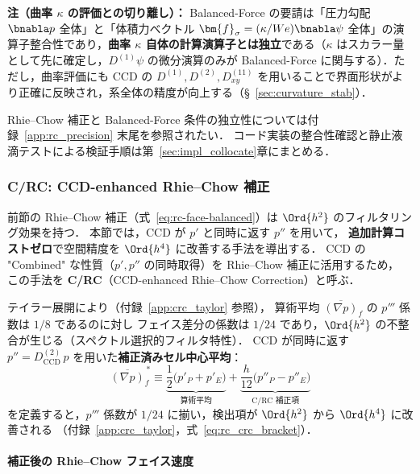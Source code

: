 \medskip
\noindent\textbf{注（曲率 $\kappa$ の評価との切り離し）：}
Balanced-Force の要請は「圧力勾配 $\bnabla p$ 全体」と「体積力ベクトル $\bm{f}_\sigma = (\kappa/We)\bnabla\psi$ 全体」の演算子整合性であり，\textbf{曲率 $\kappa$ 自体の計算演算子とは独立}である（$\kappa$ はスカラー量として先に確定し，$D^{(1)}\psi$ の微分演算のみが Balanced-Force に関与する）．ただし，曲率評価にも CCD の $D^{(1)}, D^{(2)}, D^{(11)}_{xy}$ を用いることで界面形状がより正確に反映され，系全体の精度が向上する（§~\ref{sec:curvature_stab}）．

Rhie--Chow 補正と Balanced-Force 条件の独立性については付録~\ref{app:rc_precision} 末尾を参照されたい．
コード実装の整合性確認と静止液滴テストによる検証手順は第~\ref{sec:impl_collocate}章にまとめる．

\subsubsection{C/RC: CCD-enhanced Rhie--Chow 補正}
\label{sec:rc_high_order}

前節の Rhie--Chow 補正（式~\eqref{eq:rc-face-balanced}）は $\Ord{h^2}$ のフィルタリング効果を持つ．
本節では，CCD が $p'$ と同時に返す $p''$ を用いて，
\textbf{追加計算コストゼロ}で空間精度を $\Ord{h^4}$ に改善する手法を導出する．
CCD の "Combined" な性質（$p', p''$ の同時取得）を Rhie--Chow 補正に活用するため，
この手法を \textbf{C/RC}（CCD-enhanced Rhie--Chow Correction）と呼ぶ．

テイラー展開により（付録~\ref{app:crc_taylor} 参照），
算術平均 $\overline{(\nabla p)}_f$ の $p'''$ 係数は $1/8$ であるのに対し
フェイス差分の係数は $1/24$ であり，$\Ord{h^2}$ の不整合が生じる（スペクトル選択的フィルタ特性）．
CCD が同時に返す $p'' = D^{(2)}_\mathrm{CCD}\,p$ を用いた\textbf{補正済みセル中心平均}：
\begin{equation}
  \overline{(\nabla p)}_f^{\,*}
  \equiv
  \underbrace{\frac{1}{2}\bigl(p'_P + p'_E\bigr)}_{\text{算術平均}}
  + \underbrace{\frac{h}{12}\bigl(p''_P - p''_E\bigr)}_{\text{C/RC 補正項}}
  \label{eq:rc_avg_corrected}
\end{equation}
を定義すると，$p'''$ 係数が $1/24$ に揃い，検出項が $\Ord{h^2}$ から $\Ord{h^4}$ に改善される
（付録~\ref{app:crc_taylor}，式~\eqref{eq:rc_crc_bracket}）．

\paragraph{補正後の Rhie--Chow フェイス速度}

